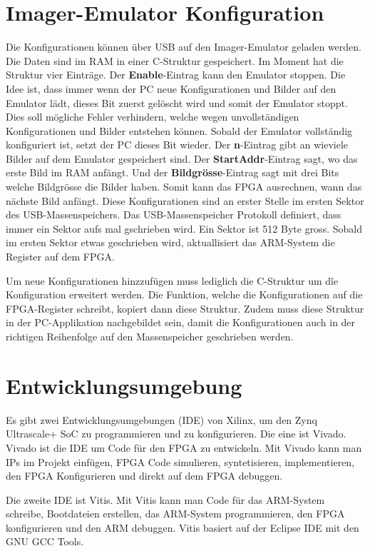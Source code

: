 \documentclass{article}
\begin{document}
\section{Imager-Emulator Konfiguration}
Die Konfigurationen können über USB auf den Imager-Emulator geladen werden. Die Daten sind im RAM in einer C-Struktur gespeichert. Im Moment hat die Struktur vier Einträge. Der \textbf{Enable}-Eintrag kann den Emulator stoppen. Die Idee ist, dass immer wenn der PC neue Konfigurationen und Bilder auf den Emulator lädt, dieses Bit zuerst gelöscht wird und somit der Emulator stoppt. Dies soll mögliche Fehler verhindern, welche wegen unvollständigen Konfigurationen und Bilder entstehen können. Sobald der Emulator vollständig konfiguriert ist, setzt der PC dieses Bit wieder. Der \textbf{n}-Eintrag gibt an wieviele Bilder auf dem Emulator gespeichert sind. Der \textbf{StartAddr}-Eintrag sagt, wo das erste Bild im RAM anfängt. Und der \textbf{Bildgrösse}-Eintrag sagt mit drei Bits welche Bildgrösse die Bilder haben. Somit kann das FPGA ausrechnen, wann das nächste Bild anfängt. Diese Konfigurationen sind an erster Stelle im ersten Sektor des USB-Massenspeichers. Das USB-Massenspeicher Protokoll definiert, dass immer ein Sektor aufs mal gschrieben wird. Ein Sektor ist 512 Byte gross. Sobald im ersten Sektor etwas geschrieben wird, aktuallisiert das ARM-System die Register auf dem FPGA.

Um neue Konfigurationen hinzzufügen muss lediglich die C-Struktur um dîe Konfiguration erweitert werden. Die Funktion, welche die Konfigurationen auf die FPGA-Register schreibt, kopiert dann diese Struktur. Zudem muss diese Struktur in der PC-Applikation nachgebildet sein, damit die Konfigurationen auch in der richtigen Reihenfolge auf den Massenspeicher geschrieben werden.

\section{Entwicklungsumgebung}
Es gibt zwei Entwicklungsumgebungen (IDE) von Xilinx, um den Zynq Ultrascale+ SoC zu programmieren und zu konfigurieren. Die eine ist Vivado. Vivado ist die IDE um Code für den FPGA zu entwickeln. Mit Vivado kann man IPs im Projekt einfügen, FPGA Code simulieren, syntetisieren, implementieren, den FPGA Konfigurieren und direkt auf dem FPGA debuggen.

Die zweite IDE ist Vitis. Mit Vitis kann man Code für das ARM-System schreibe, Bootdateien erstellen, das ARM-System programmieren, den FPGA konfigurieren und den ARM debuggen. Vitis basiert auf der Eclipse IDE mit den GNU GCC Tools.
\end{document}
